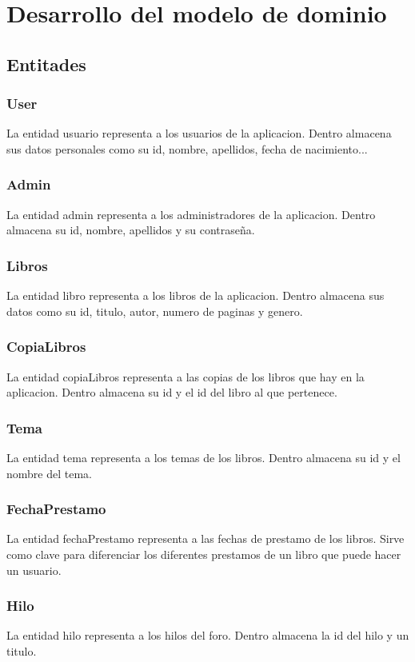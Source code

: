 ﻿\documentclass{report}
\begin{document}
        \section{Desarrollo del modelo de dominio}
            \subsection{Entitades}
                \subsubsection{User}
                    La entidad usuario representa a los usuarios de la aplicacion. Dentro almacena sus datos personales como su id, nombre, apellidos, fecha de nacimiento...
                \subsubsection{Admin}
                    La entidad admin representa a los administradores de la aplicacion. Dentro almacena su id, nombre, apellidos y su contraseña.
                \subsubsection{Libros}
                    La entidad libro representa a los libros de la aplicacion. Dentro almacena sus datos como su id, titulo, autor, numero de paginas y genero.
                \subsubsection{CopiaLibros}
                    La entidad copiaLibros representa a las copias de los libros que hay en la aplicacion. Dentro almacena su id y el id del libro al que pertenece.
                \subsubsection{Tema}
                    La entidad tema representa a los temas de los libros. Dentro almacena su id y el nombre del tema.
                \subsubsection{FechaPrestamo}
                    La entidad fechaPrestamo representa a las fechas de prestamo de los libros. Sirve como clave para diferenciar los diferentes prestamos de un libro que puede hacer un usuario.
                \subsubsection{Hilo}
                    La entidad hilo representa a los hilos del foro. Dentro almacena la id del hilo y un titulo.
\end{document}
